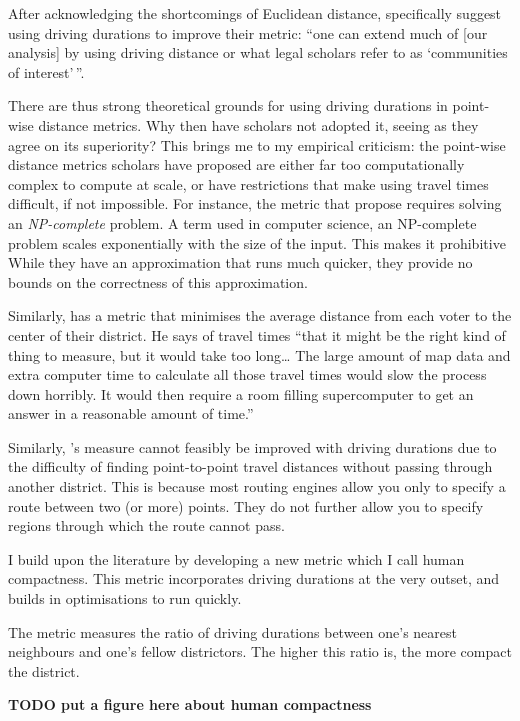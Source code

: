 \documentclass[]{article}
\begin{document}
After acknowledging the shortcomings of Euclidean distance,
\citeauthor{fh2011} specifically suggest using driving durations to
improve their metric: ``one can extend much of {[}our analysis{]} by
using driving distance or what legal scholars refer to as `communities
of interest'\,''.

There are thus strong theoretical grounds for using driving durations in
point-wise distance metrics. Why then have scholars not adopted it,
seeing as they agree on its superiority? This brings me to my empirical
criticism: the point-wise distance metrics scholars have proposed are
either far too computationally complex to compute at scale, or have
restrictions that make using travel times difficult, if not impossible.
For instance, the metric that \citet{fh2011} propose requires solving an
\emph{NP-complete} problem. A term used in computer science, an
NP-complete problem scales exponentially with the size of the input.
This makes it prohibitive While they have an approximation that runs
much quicker, they provide no bounds on the correctness of this
approximation.

Similarly, \citeauthor{olson2010} has a metric that minimises the
average distance from each voter to the center of their district. He
says of travel times ``that it might be the right kind of thing to
measure, but it would take too long\ldots{} The large amount of map data
and extra computer time to calculate all those travel times would slow
the process down horribly. It would then require a room filling
supercomputer to get an answer in a reasonable amount of time.''
\citep{olson2010}

Similarly, \citeauthor{cm2010}'s measure cannot feasibly be improved
with driving durations due to the difficulty of finding point-to-point
travel distances without passing through another district. This is
because most routing engines allow you only to specify a route between
two (or more) points. They do not further allow you to specify regions
through which the route cannot pass.

I build upon the literature by developing a new metric which I call
human compactness. This metric incorporates driving durations at the
very outset, and builds in optimisations to run quickly.

The metric measures the ratio of driving durations between one's nearest
neighbours and one's fellow districtors. The higher this ratio is, the
more compact the district.

\textbf{TODO put a figure here about human compactness}
\end{document}

